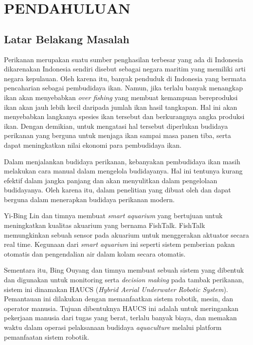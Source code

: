 
\chapter{PENDAHULUAN}

\section{Latar Belakang Masalah}

Perikanan merupakan suatu sumber penghasilan terbesar yang ada di Indonesia dikarenakan Indonesia sendiri disebut sebagai negara maritim yang memiliki arti negara kepulauan. Oleh karena itu, banyak penduduk di Indonesia yang bermata pencaharian sebagai pembudidaya ikan. Namun, jika terlalu banyak menangkap ikan akan menyebabkan \textit{over fishing} yang membuat kemampuan bereproduksi ikan akan jauh lebih kecil daripada jumlah ikan hasil tangkapan. Hal ini akan menyebabkan langkanya spesies ikan tersebut dan berkurangnya angka produksi ikan. Dengan demikian, untuk mengatasi hal tersebut diperlukan budidaya perikanan yang berguna untuk menjaga ikan sampai masa panen tiba, serta dapat meningkatkan nilai ekonomi para pembudidaya ikan.

Dalam menjalankan budidaya perikanan, kebanyakan pembudidaya ikan masih melakukan cara manual dalam mengelola budidayanya. Hal ini tentunya kurang efektif dalam jangka panjang dan akan menyulitkan dalam pengelolaan budidayanya. Oleh karena itu, dalam penelitian yang dibuat oleh \citep{fishtalk} dan \citep{haucs} dapat berguna dalam menerapkan budidaya perikanan modern.

Yi-Bing Lin dan timnya membuat \textit{smart aquarium} yang bertujuan untuk meningkatkan kualitas akuarium yang bernama FishTalk. FishTalk memungkinkan sebuah sensor pada akuarium untuk menggerakan aktuator secara real time. Kegunaan dari \textit{smart aquarium} ini seperti sistem pemberian pakan otomatis dan pengendalian air dalam kolam secara otomatis. \citep{fishtalk}

Sementara itu, Bing Ouyang dan timnya membuat sebuah sistem yang dibentuk dan digunakan untuk monitoring serta \textit{decision making} pada tambak perikanan, sistem ini dinamakan HAUCS (\textit{Hybrid Aerial Underwater Robotic System}). Pemantauan ini dilakukan dengan memanfaatkan sistem robotik, mesin, dan operator manusia. Tujuan dibentuknya HAUCS ini adalah untuk meringankan pekerjaan manusia dari tugas yang berat, terlalu banyak biaya, dan memakan waktu dalam operasi pelaksanaan budidaya \textit{aquaculture} melalui platform pemanfaatan sistem robotik. \citep{haucs}

